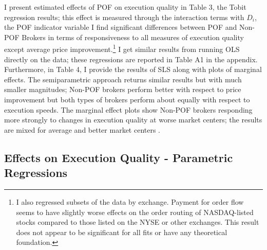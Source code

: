 \documentclass[12pt,a4paper]{article}
\begin{document}
	 I present estimated effects of POF on execution quality in Table 3, the Tobit regression results; this effect is measured through the interaction terms with $D_i$, the POF indicator variable I find significant differences between POF and Non-POF Brokers in terms of responsiveness to all measures of execution quality except average price improvement.\footnote{I also regressed subsets of the data by exchange. Payment for order flow seems to have slightly worse effects on the order routing of NASDAQ-listed stocks compared to those listed on the NYSE or other exchanges. This result does not appear to be significant for all fits or have any theoretical foundation.}  I get similar results from running OLS directly on the data; these regressions are reported in Table A1 in the appendix. Furthermore, in Table 4, I provide the results of SLS along with plots of marginal effects. The semiparametric approach returns similar results but with much smaller magnitudes; Non-POF brokers perform better with respect to price improvement but both types of brokers perform about equally with respect to execution speeds. The marginal effect plots show Non-POF brokers responding more strongly to changes in execution quality at worse market centers; the results are mixed for average and better market centers . 

\subsection{Effects on Execution Quality - Parametric Regressions}
\end{document}
